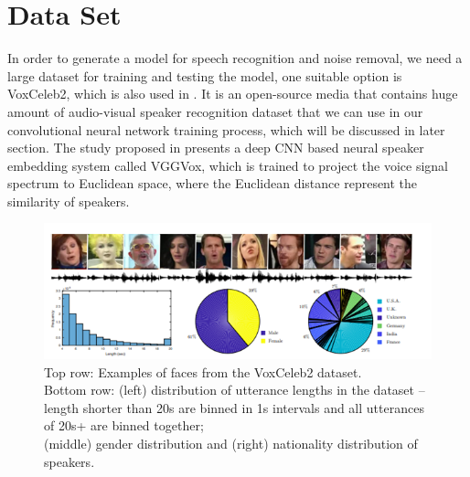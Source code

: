 \documentclass[runningheads,a4paper]{llncs}
\begin{document}
\section{Data Set}
In order to generate a model for speech recognition and noise removal, we need a large dataset for training and testing the model, one suitable option is VoxCeleb2, which is also used in \cite{7}. It is an open-source media that contains huge amount of audio-visual speaker recognition dataset that we can use in our convolutional neural network training process, which will be discussed in later section. The study proposed in \cite{7} presents a deep CNN based neural speaker embedding system called VGGVox, which is trained to project the voice signal spectrum to Euclidean space, where the Euclidean distance represent the similarity of speakers.\\

\begin{figure}[H]
\includegraphics[scale=0.6]{figure3.png}
\caption{Top row: Examples of faces from the VoxCeleb2 dataset.\\Bottom row: (left) distribution of utterance lengths in the dataset – length shorter than 20s are binned in 1s intervals and all utterances of 20s+ are binned together; \\(middle) gender distribution and (right) nationality distribution of speakers. \cite{7}}
\label{fig:framework}
\end{figure}



\end{document}
